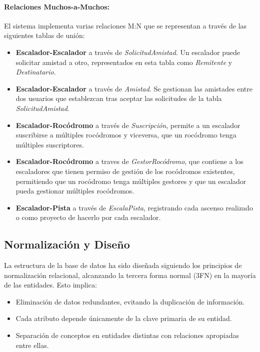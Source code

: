 \paragraph{Relaciones Muchos-a-Muchos:} El sistema implementa varias relaciones M:N que se representan a través de las siguientes tablas de unión:
\begin{itemize}
    \item \textbf{Escalador-Escalador} a través de \textit{SolicitudAmistad}. Un escalador puede solicitar amistad a otro, representados en esta tabla como 
    \textit{Remitente} y \textit{Destinatario}.

    \item \textbf{Escalador-Escalador} a través de \textit{Amistad}. Se gestionan las amistades entre dos usuarios que establezcan tras aceptar
    las solicitudes de la tabla \textit{SolicitudAmistad}.

    \item \textbf{Escalador-Rocódromo} a través de \textit{Suscripción}, permite a un escalador suscribirse a múltiples rocódromos y viceversa, que un rocódromo
    tenga múltiples suscriptores.

    \item \textbf{Escalador-Rocódromo} a traves de \textit{GestorRocódromo}, que contiene a los escaladores que tienen permiso de gestión de los rocódromos existentes, 
    permitiendo que un rocódromo tenga múltiples gestores y que un escalador pueda gestionar múltiples rocódromos.

    \item \textbf{Escalador-Pista} a través de \textit{EscalaPista}, registrando cada ascenso realizado o como proyecto de hacerlo por cada escalador.
\end{itemize}

\subsection{Normalización y Diseño}

La estructura de la base de datos ha sido diseñada siguiendo los principios de normalización relacional, alcanzando 
la tercera forma normal (3FN) en la mayoría de las entidades. Esto implica:

\begin{itemize}
    \item Eliminación de datos redundantes, evitando la duplicación de información.
    \item Cada atributo depende únicamente de la clave primaria de su entidad.
    \item Separación de conceptos en entidades distintas con relaciones apropiadas entre ellas.
\end{itemize}

